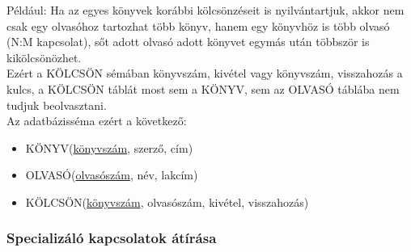 \documentclass[tikz,12pt,margin=0px]{article}
\begin{document}
\begin{itemize}
        Például: Ha az egyes könyvek korábbi kölcsönzéseit is nyilvántartjuk, akkor nem csak egy olvasóhoz tartozhat több könyv, hanem egy könyvhöz is több olvasó (N:M kapcsolat), sőt adott olvasó adott könyvet egymás után többször is kikölcsönözhet.\\

        Ezért a KÖLCSÖN sémában {könyvszám, kivétel} vagy {könyvszám, visszahozás} a kulcs, a KÖLCSÖN táblát most sem a KÖNYV, sem az OLVASÓ táblába nem tudjuk beolvasztani.\\

        Az adatbázisséma ezért a következő:
        {\small
        \begin{itemize}
            \item KÖNYV(\underline{könyvszám}, szerző, cím)
            \item OLVASÓ(\underline{olvasószám}, név, lakcím)
            \item KÖLCSÖN(\underline{könyvszám}, olvasószám, kivétel, visszahozás)
        \end{itemize}
        }
	\end{itemize}
	
    \subsubsection*{Specializáló kapcsolatok átírása}
\end{document}
